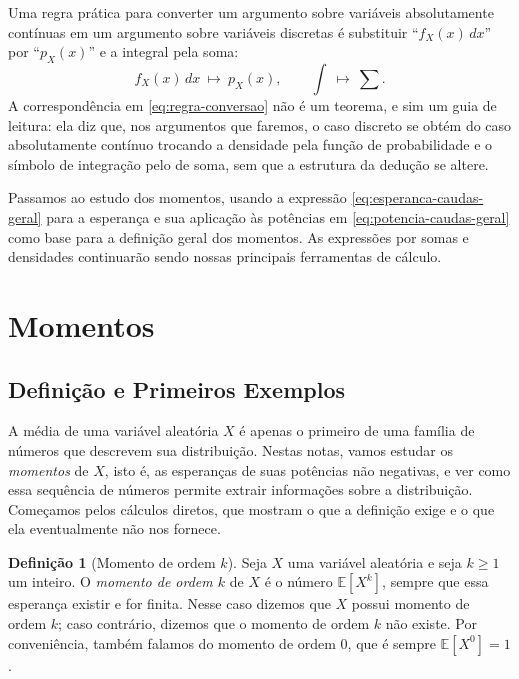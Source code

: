 \documentclass[12pt,portuguese]{article}
\theoremstyle{definition}
\newtheorem{definition}[definition]{Definição}
\theoremstyle{plainexercise}
\theoremstyle{starredexercise}
\theoremstyle{definition}
\begin{document}
Uma regra prática para converter um argumento sobre variáveis
absolutamente contínuas em um argumento sobre variáveis discretas é substituir
``$f_X(x)\,dx$'' por ``$p_X(x)$'' e a integral pela soma:
\begin{equation}\label{eq:regra-conversao}
f_X(x)\,dx \ \longmapsto\ p_X(x),
\qquad
\int \ \longmapsto\ \sum .
\end{equation}
A correspondência em \eqref{eq:regra-conversao} não é um teorema, e sim um guia
de leitura: ela diz que, nos argumentos que faremos, o caso discreto se obtém
do caso absolutamente contínuo trocando a densidade pela função de
probabilidade e o símbolo de integração pelo de soma, sem que a estrutura
da dedução se altere.

Passamos ao estudo dos momentos, usando a expressão
\eqref{eq:esperanca-caudas-geral} para a esperança e sua aplicação às
potências em \eqref{eq:potencia-caudas-geral} como base para a definição
geral dos momentos. As expressões por somas e densidades continuarão sendo
nossas principais ferramentas de cálculo.

\section{Momentos}\label{sec:momentos}

\subsection{Definição e Primeiros Exemplos}\label{subsec:momentos-exemplos}

A média de uma variável aleatória $X$ é apenas o primeiro de uma família de
números que descrevem sua distribuição. Nestas notas, vamos estudar os
\emph{momentos} de $X$, isto é, as esperanças de suas potências não negativas, e ver como
essa sequência de números permite extrair informações sobre a distribuição.
Começamos pelos cálculos diretos, que mostram o que a definição exige e o que
ela eventualmente não nos fornece.

\begin{definition}[Momento de ordem $k$]\label{def:momento}
Seja $X$ uma variável aleatória e seja $k\geqslant 1$ um inteiro. O
\emph{momento de ordem $k$} de $X$ é o número $\mathbb{E}[X^k]$, sempre que essa
esperança existir e for finita. Nesse caso dizemos que $X$ possui momento de
ordem $k$; caso contrário, dizemos que o momento de ordem $k$ não existe. Por
conveniência, também falamos do momento de ordem $0$, que é sempre
$\mathbb{E}[X^0]=1$.
\end{definition}
\end{document}
